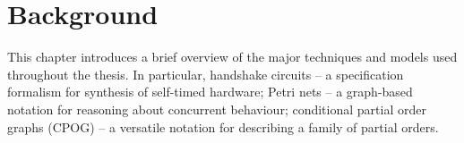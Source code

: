 \chapter{Background}

\label{chap:Background}
This chapter introduces a brief overview of the major techniques and models used throughout the thesis. In particular, handshake circuits -- a specification formalism for synthesis of self-timed hardware; Petri nets -- a graph-based notation for reasoning about concurrent behaviour; conditional partial order graphs (CPOG) -- a versatile notation for describing a family of partial orders.






